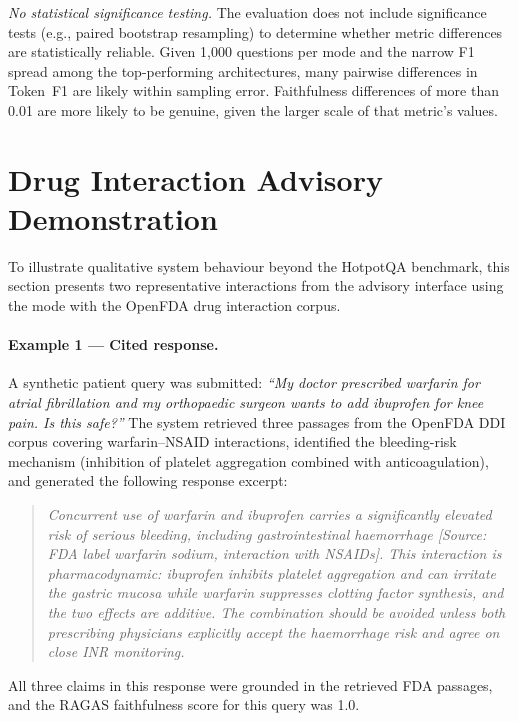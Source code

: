 \emph{No statistical significance testing.}
The evaluation does not include significance tests (e.g., paired bootstrap
resampling) to determine whether metric differences are statistically reliable.
Given 1{,}000 questions per mode and the narrow F1 spread among the
top-performing architectures, many pairwise differences in Token~F1 are likely
within sampling error.
Faithfulness differences of more than 0.01 are more likely to be genuine, given
the larger scale of that metric's values.

\section{Drug Interaction Advisory Demonstration}
\label{sec:ddi_demo}

To illustrate qualitative system behaviour beyond the HotpotQA benchmark,
this section presents two representative interactions from the \medrag{}
advisory interface using the \rarerag{} mode with the OpenFDA drug interaction
corpus.

\paragraph{Example 1 --- Cited response.}
A synthetic patient query was submitted: \textit{``My doctor prescribed warfarin
for atrial fibrillation and my orthopaedic surgeon wants to add ibuprofen for
knee pain. Is this safe?''}
The system retrieved three passages from the OpenFDA DDI corpus covering
warfarin--NSAID interactions, identified the bleeding-risk mechanism
(inhibition of platelet aggregation combined with anticoagulation),
and generated the following response excerpt:

\begin{quote}\small
\textit{Concurrent use of warfarin and ibuprofen carries a significantly elevated
risk of serious bleeding, including gastrointestinal haemorrhage
[Source: FDA label warfarin sodium, interaction with NSAIDs].
This interaction is pharmacodynamic: ibuprofen inhibits platelet aggregation
and can irritate the gastric mucosa while warfarin suppresses clotting factor
synthesis, and the two effects are additive.
The combination should be avoided unless both prescribing physicians explicitly
accept the haemorrhage risk and agree on close INR monitoring.}
\end{quote}

All three claims in this response were grounded in the retrieved FDA passages,
and the RAGAS faithfulness score for this query was 1.0.

